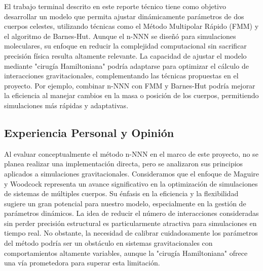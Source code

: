 El trabajo terminal descrito en este reporte técnico tiene como objetivo desarrollar un modelo que permita ajustar dinámicamente parámetros de dos cuerpos celestes, utilizando técnicas como el Método Multipolar Rápido (FMM) y el algoritmo de Barnes-Hut. Aunque el n-NNN se diseñó para simulaciones moleculares, su enfoque en reducir la complejidad computacional sin sacrificar precisión física resulta altamente relevante. La capacidad de ajustar el modelo mediante "cirugía Hamiltoniana" podría adaptarse para optimizar el cálculo de interacciones gravitacionales, complementando las técnicas propuestas en el proyecto. Por ejemplo, combinar n-NNN con FMM y Barnes-Hut podría mejorar la eficiencia al manejar cambios en la masa o posición de los cuerpos, permitiendo simulaciones más rápidas y adaptativas.

\subsection{Experiencia Personal y Opinión}

Al evaluar conceptualmente el método n-NNN en el marco de este proyecto, no se planea realizar una implementación directa, pero se analizaron sus principios aplicados a simulaciones gravitacionales. Consideramos que el enfoque de Maguire y Woodcock representa un avance significativo en la optimización de simulaciones de sistemas de múltiples cuerpos. Su énfasis en la eficiencia y la flexibilidad sugiere un gran potencial para nuestro modelo, especialmente en la gestión de parámetros dinámicos. La idea de reducir el número de interacciones consideradas sin perder precisión estructural es particularmente atractiva para simulaciones en tiempo real. No obstante, la necesidad de calibrar cuidadosamente los parámetros del método podría ser un obstáculo en sistemas gravitacionales con comportamientos altamente variables, aunque la "cirugía Hamiltoniana" ofrece una vía prometedora para superar esta limitación.